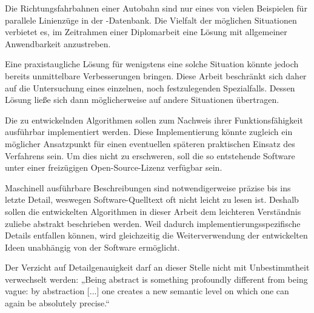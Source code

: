 \documentclass[../main/thesis.tex]{subfiles}
\begin{document}

Die Richtungsfahrbahnen einer Autobahn sind nur eines von vielen Beispielen für parallele Linienzüge in der \osm-Datenbank.
Die Vielfalt der möglichen Situationen verbietet es, im Zeitrahmen einer Diplomarbeit eine Lösung mit allgemeiner Anwendbarkeit anzustreben.

Eine praxistaugliche Lösung für wenigstens eine solche Situation könnte jedoch bereits unmittelbare Verbesserungen bringen.
Diese Arbeit beschränkt sich daher auf die Untersuchung eines einzelnen, noch festzulegenden Spezialfalls.
Dessen Lösung ließe sich dann möglicherweise auf andere Situationen übertragen.

Die zu entwickelnden Algorithmen sollen zum Nachweis ihrer Funktionsfähigkeit ausführbar implementiert werden.
Diese Implementierung könnte zugleich ein möglicher Ansatzpunkt für einen eventuellen späteren praktischen Einsatz des Verfahrens sein.
Um dies nicht zu erschweren, soll die so entstehende Software unter einer freizügigen Open-Source-Lizenz verfügbar sein.

Maschinell ausführbare Beschreibungen sind notwendigerweise präzise bis ins letzte Detail, weswegen Software-Quelltext oft nicht leicht zu lesen ist.
Deshalb sollen die entwickelten Algorithmen in dieser Arbeit dem leichteren Verständnis zuliebe abstrakt beschrieben werden.
Weil dadurch implementierungsspezifische Details entfallen können, wird gleichzeitig die Weiterverwendung der entwickelten Ideen unabhängig von der Software ermöglicht.

Der Verzicht auf Detailgenauigkeit darf an dieser Stelle nicht mit Unbestimmtheit verwechselt werden:
„Being abstract is something profoundly different from being vague: by abstraction [...] one creates a new semantic level on which one can again be absolutely precise.“ 



\end{document}
